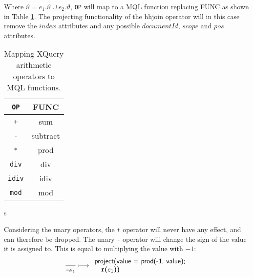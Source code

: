 Where $\vartheta = e_1.\vartheta \cup e_2.\vartheta$, \texttt{OP} will map to a MQL function replacing
\textsf{FUNC} as shown in Table \ref{tab:trans:TD:binOpMap}. The projecting functionality of the
\textsf{hhjoin} operator will in this case remove the $index$ attributes and any possible $documentId$, $scope$
and $pos$ attributes.

\begin{table}[h]
\centering
\begin{tabular}{c|c}
\texttt{OP} & \textsf{FUNC} \\ \hline
\texttt{+} 	& \textsf{sum} \\
\texttt{-} 	& \textsf{subtract} \\
\texttt{*} 	& \textsf{prod} \\
\texttt{div} 	& \textsf{div} \\
\texttt{idiv} 	& \textsf{idiv} \\
\texttt{mod} 	& \textsf{mod} \\
\end{tabular}s
\caption{Mapping XQuery arithmetic operators to MQL functions. \label{tab:trans:TD:binOpMap}}
\end{table}

Considering the unary operators, the \texttt{+} operator will never have any effect, and can therefore be dropped.
The unary \texttt{-} operator will change the sign of the value it is assigned to. This is equal to multiplying
the value with $-1$:
\begin{equation}
\frac{}{\mbox{\texttt{-}}e_1}\longmapsto 
\begin{array}{l}
\mbox{\textsf{project(value = prod(-1, value);}} \\ \quad
\mbox{\textbf{r(}}e_1\mbox{\textbf{)}\textsf{)}}
\end{array}
\label{rule:trans:TD:unaryMin}
\end{equation}

